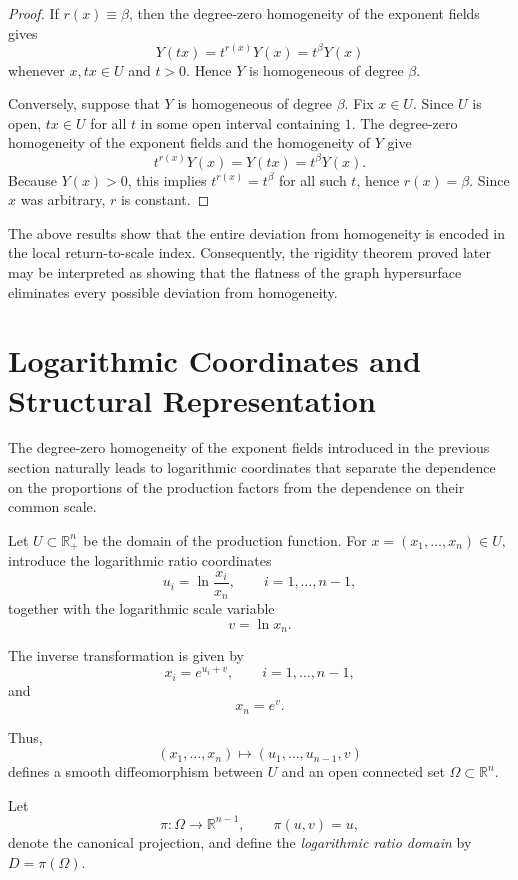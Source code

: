 \documentclass[12pt]{amsart}
\begin{document}
\begin{proof}
If $r(x)\equiv\beta$, then the degree-zero homogeneity of the exponent
fields gives
\[
Y(tx)=t^{r(x)}Y(x)=t^\beta Y(x)
\]
whenever $x,tx\in U$ and $t>0$. Hence $Y$ is homogeneous of degree
$\beta$.

Conversely, suppose that $Y$ is homogeneous of degree $\beta$. Fix $x\in U$.
Since $U$ is open, $tx\in U$ for all $t$ in some open interval containing $1$.
The degree-zero homogeneity of the exponent fields and the homogeneity of $Y$
give
\[
t^{r(x)}Y(x)=Y(tx)=t^\beta Y(x).
\]
Because $Y(x)>0$, this implies $t^{r(x)}=t^\beta$ for all such $t$, hence
$r(x)=\beta$. Since $x$ was arbitrary, $r$ is constant.
\end{proof}



The above results show that the entire deviation from homogeneity is
encoded in the local return-to-scale index.
Consequently, the rigidity theorem proved later may be interpreted as
showing that the flatness of the graph hypersurface eliminates every
possible deviation from homogeneity.









\section{Logarithmic Coordinates and Structural Representation}\label{S3}

The degree-zero homogeneity of the exponent fields introduced in the
previous section naturally leads to logarithmic coordinates that separate
the dependence on the proportions of the production factors from the
dependence on their common scale.

Let
\(
U\subset\mathbb R_+^n
\)
be the domain of the production function.
For
\(
x=(x_1,\ldots,x_n)\in U,
\)
introduce the logarithmic ratio coordinates
\[
u_i
=
\ln\frac{x_i}{x_n},
\qquad
i=1,\ldots,n-1,
\]
together with the logarithmic scale variable
\[
v=\ln x_n.
\]

The inverse transformation is given by
\[
x_i=e^{u_i+v},
\qquad
i=1,\ldots,n-1,
\]
and
\[
x_n=e^v.
\]

Thus,
\[
(x_1,\ldots,x_n)
\longmapsto
(u_1,\ldots,u_{n-1},v)
\]
defines a smooth diffeomorphism between \(U\) and an open connected set
\(
\Omega\subset\mathbb R^n.
\)

Let
\[
\pi:\Omega\longrightarrow\mathbb R^{n-1},
\qquad
\pi(u,v)=u,
\]
denote the canonical projection, and define the
\emph{logarithmic ratio domain} by
\(
D=\pi(\Omega).
\)
\end{document}
